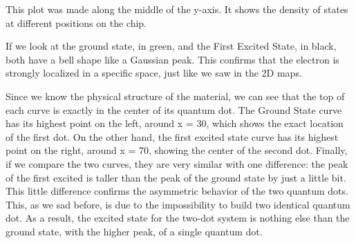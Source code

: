This plot was made along the middle of the y-axis. It shows the density of states at different positions on the chip.

If we look at the ground state, in green, and the First Excited State, in black, both have a bell shape like a Gaussian peak. This confirms that the electron is strongly localized in a specific space, just like we saw in the 2D maps.

Since we know the physical structure of the material, we can see that the top of each curve is exactly in the center of its quantum dot. The Ground State curve has its highest point on the left, around x = 30, which shows the exact location of the first dot. On the other hand, the first excited state curve has its highest point on the right, around x = 70, showing the center of the second dot.
Finally, if we compare the two curves, they are very similar with one difference: the peak of the first excited is taller than the peak of the ground state by just a little bit. This little difference confirms the asymmetric behavior of the two quantum dots. This, as we sad before, is due to the impossibility to build two identical quantum dot. As a result, the excited state for the two-dot system is nothing else than the ground state, with the higher peak, of a single quantum dot.